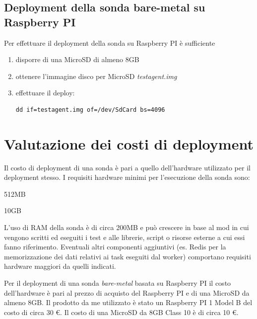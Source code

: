 \documentclass[../main.tex]{subfiles}
\begin{document}
\subsection {Deployment della sonda bare-metal su Raspberry PI}
Per effettuare il deployment della sonda su Raspberry PI è sufficiente
\begin{enumerate}
\item disporre di una MicroSD di almeno 8GB
\item ottenere l'immagine disco per MicroSD \textit{testagent.img}
\item effettuare il deploy:
\begin{Verbatim}
dd if=testagent.img of=/dev/SdCard bs=4096
\end{Verbatim}
\end{enumerate}
\section{Valutazione dei costi di deployment}
Il costo di deployment di una sonda è pari a quello dell'hardware utilizzato per il deployment stesso.
I requisiti hardware minimi per l'esecuzione della sonda sono:
\begin{description}[nolistsep]
\item[RAM] 512MB
\item[Hard Disk] 10GB
\end{description}
L'uso di RAM della sonda è di circa 200MB e può crescere in base al mod in cui vengono scritti ed eseguiti i test e alle librerie, script o risorse esterne a cui essi fanno riferimento.
Eventuali altri componenti aggiuntivi (es. Redis per la memorizzazione dei dati relativi ai task eseguiti dal worker) comportano requisiti hardware maggiori da quelli indicati.

Per il deployment di una sonda \textit{bare-metal} basata su Raspberry PI il costo dell'hardware è pari al prezzo di acquisto del Raspberry PI e di una MicroSD da almeno 8GB.
Il prodotto da me utilizzato è stato un Raspberry PI 1 Model B del costo di circa 30 \euro.
Il costo di una MicroSD da 8GB Class 10 è di circa 10 \euro.
\end{document}
